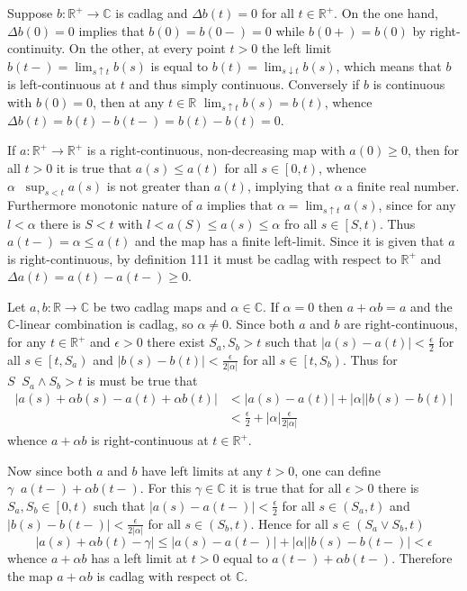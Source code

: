 \documentclass[a4paper]{article}
\newcommand{\clop}[1]{\left [ #1 \right )}
\newcommand{\brac}[1]{\left ( #1 \right )}
\newcommand{\abs}[1]{\left | #1 \right |}
\newcommand{\Real}{\mathbb{R}}
\newcommand{\Cplx}{\mathbb{C}}
\newcommand{\defn}{\mathop{\overset{\Delta}{=}}\nolimits}
\begin{document}
Suppose $b:\Real^+\to \Cplx$ is cadlag and $\Delta b\brac{t} = 0$ for all $t\in\Real^+$. On the one hand, $\Delta b\brac{0} = 0$ implies that $b\brac{0}=b\brac{0-}=0$ while $b\brac{0+}=b\brac{0}$ by right-continuity. On the other, at every point $t>0$ the left limit $b\brac{t-}=\lim_{s\uparrow t} b\brac{s}$ is equal to $b\brac{t}=\lim_{s\downarrow t} b\brac{s}$, which means that $b$ is left-continuous at $t$ and thus simply continuous. Conversely if $b$ is continuous with $b\brac{0}=0$, then at any $t\in \Real$ $\lim_{s\uparrow t} b\brac{s}=b\brac{t}$, whence $\Delta b\brac{t} = b\brac{t}-b\brac{t-}=b\brac{t}-b\brac{t}=0$.

If $a:\Real^+\to\Real^+$ is a right-continuous, non-decreasing map with $a\brac{0}\geq 0$, then for all $t>0$ it is true that $a\brac{s}\leq a\brac{t}$ for all $s\in \clop{0,t}$, whence $\alpha\defn \sup_{s<t} a\brac{s}$ is not greater than $a\brac{t}$, implying that $\alpha$ a finite real number. Furthermore monotonic nature of $a$ implies that $\alpha=\lim_{s\uparrow t}a\brac{s}$, since for any $l<\alpha$ there is $S<t$ with $l<a\brac{S}\leq a\brac{s}\leq \alpha$ fro all $s\in\clop{S,t}$. Thus $a\brac{t-}=\alpha\leq a\brac{t}$ and the map has a finite left-limit. Since it is given that $a$ is right-continuous, by definition 111 it must be cadlag with respect to $\Real^+$ and $\Delta a\brac{t} = a\brac{t}-a\brac{t-}\geq 0$.

Let $a,b:\Real\to \Cplx$ be two cadlag maps and $\alpha\in \Cplx$. If $\alpha=0$ then $a+\alpha b = a$ and the $\Cplx$-linear combination is cadlag, so $\alpha\neq 0$. Since both $a$ and $b$ are right-continuous, for any $t\in \Real^+$ and $\epsilon>0$ there exist $S_a, S_b>t$ such that $\abs{a\brac{s}-a\brac{t}}<\frac{\epsilon}{2}$ for all $s\in \clop{t,S_a}$ and $\abs{b\brac{s}-b\brac{t}}<\frac{\epsilon}{2\abs{\alpha}}$ for all $s\in \clop{t,S_b}$. Thus for $S\defn S_a\wedge S_b>t$ is must be true that \begin{align*}\abs{a\brac{s}+\alpha b\brac{s} - a\brac{t}+\alpha b\brac{t} }&<\abs{a\brac{s} - a\brac{t}}+\abs{\alpha}\abs{b\brac{s} - b\brac{t} }\\&<\frac{\epsilon}{2} + \abs{\alpha}\frac{\epsilon}{2\abs{\alpha}}\end{align*} whence $a+\alpha b$ is right-continuous at $t\in \Real^+$.

Now since both $a$ and $b$ have left limits at any $t>0$, one can define $\gamma\defn a\brac{t-}+\alpha b\brac{t-}$. For this $\gamma\in \Cplx$ it is true that for all $\epsilon>0$ there is $S_a,S_b\in \clop{0,t}$ such that $\abs{a\brac{s}-a\brac{t-}}<\frac{\epsilon}{2}$ for all $s\in \brac{S_a,t}$ and $\abs{b\brac{s}-b\brac{t-}}<\frac{\epsilon}{2\abs{\alpha}}$ for all $s\in \brac{S_b,t}$. Hence for all $s\in \brac{S_a\vee S_b, t}$ \[\abs{a\brac{s}+\alpha b\brac{t} - \gamma} \leq \abs{a\brac{s} - a\brac{t-}}+\abs{\alpha}\abs{b\brac{s} - b\brac{t-}} < \epsilon\] whence $a+\alpha b$ has a left limit at $t>0$ equal to $a\brac{t-}+\alpha b\brac{t-}$. Therefore the map $a+\alpha b$ is cadlag with respect ot $\Cplx$.
\end{document}
